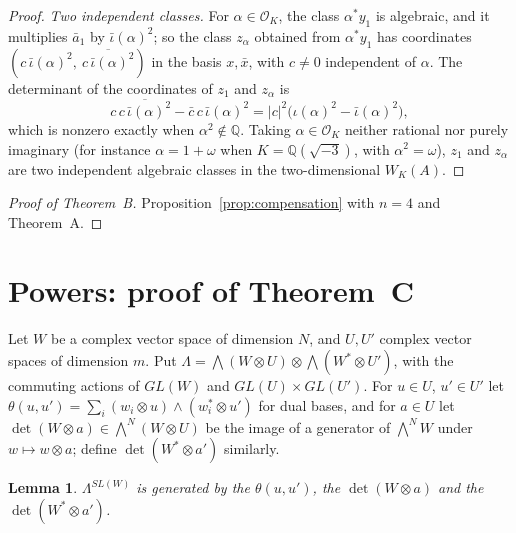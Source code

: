 \documentclass[11pt]{amsart}
\newtheorem{lemma}[theorem]{Lemma}
\theoremstyle{definition}
\theoremstyle{remark}
\newcommand{\Q}{\mathbb Q}
\begin{document}
\begin{proof}
\emph{Two independent classes.} For $\alpha\in\mathcal O_K$, the class $\alpha^*y_1$ is algebraic, and it multiplies $\bar a_1$ by $\bar\iota(\alpha)^2$; so the class $z_\alpha$ obtained from $\alpha^*y_1$ has coordinates $(c\,\bar\iota(\alpha)^2,\ \overline{c\,\bar\iota(\alpha)^2})$ in the basis $x,\bar x$, with $c\ne0$ independent of $\alpha$. The determinant of the coordinates of $z_1$ and $z_\alpha$ is
\[
c\,\overline{c\,\bar\iota(\alpha)^2}-\bar c\,c\,\bar\iota(\alpha)^2=|c|^2\big(\iota(\alpha)^2-\bar\iota(\alpha)^2\big),
\]
which is nonzero exactly when $\alpha^2\notin\Q$. Taking $\alpha\in\mathcal O_K$ neither rational nor purely imaginary (for instance $\alpha=1+\omega$ when $K=\Q(\sqrt{-3})$, with $\alpha^2=\omega$), $z_1$ and $z_\alpha$ are two independent algebraic classes in the two-dimensional $W_K(A)$.
\end{proof}

\begin{proof}[Proof of Theorem~B]
Proposition~\ref{prop:compensation} with $n=4$ and Theorem~A.
\end{proof}

\section{Powers: proof of Theorem~C}\label{sec:powers}

Let $W$ be a complex vector space of dimension $N$, and $U,U'$ complex vector spaces of dimension $m$. Put $\Lambda=\bigwedge(W\otimes U)\otimes\bigwedge(W^*\otimes U')$, with the commuting actions of $GL(W)$ and $GL(U)\times GL(U')$. For $u\in U$, $u'\in U'$ let $\theta(u,u')=\sum_i(w_i\otimes u)\wedge(w_i^*\otimes u')$ for dual bases, and for $a\in U$ let $\det(W\otimes a)\in\bigwedge^N(W\otimes U)$ be the image of a generator of $\bigwedge^NW$ under $w\mapsto w\otimes a$; define $\det(W^*\otimes a')$ similarly.

\begin{lemma}\label{lem:sl}
$\Lambda^{SL(W)}$ is generated by the $\theta(u,u')$, the $\det(W\otimes a)$ and the $\det(W^*\otimes a')$.
\end{lemma}
\end{document}
